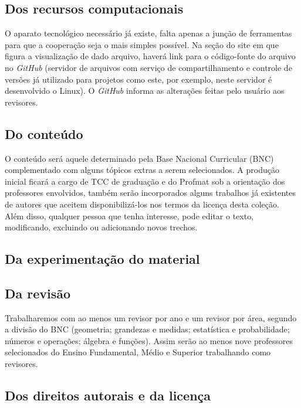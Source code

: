 \documentclass[10 pt]{article}
\begin{document}
\subsection{Dos recursos computacionais}

O aparato tecnológico necessário já existe, falta apenas a junção de ferramentas para que a cooperação seja o mais simples possível.
Na seção do site em que figura a visualização de dado arquivo, haverá link para o código-fonte do arquivo no {\it GitHub} (servidor de arquivos com serviço de compartilhamento e controle de versões já utilizado para projetos como este, por exemplo, neste servidor é desenvolvido o Linux).
O {\it GitHub} informa as alterações feitas pelo usuário aos revisores.

\subsection{Do conteúdo}

O conteúdo será aquele determinado pela Base Nacional Curricular (BNC) complementado com alguns tópicos extras a serem selecionados.
A produção inicial ficará a cargo de TCC de graduação e do Profmat sob a orientação dos professores envolvidos, também serão incorporados alguns trabalhos já existentes de autores que aceitem disponibilizá-los nos termos da licença desta coleção.
Além disso, qualquer pessoa que tenha interesse, pode editar o texto, modificando, excluindo ou adicionando novos trechos.

\subsection{Da experimentação do material}


\subsection{Da revisão}

Trabalharemos com ao menos um revisor por ano e um revisor por área, segundo a divisão do BNC (geometria; grandezas e medidas; estatística e probabilidade; números e operações; álgebra e funções).
Assim serão ao menos nove professores selecionados do Ensino Fundamental, Médio e Superior trabalhando como revisores.

\subsection{Dos direitos autorais e da licença}
\end{document}
